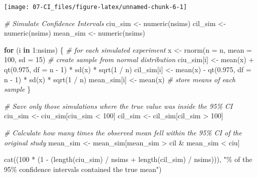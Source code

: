 \documentclass[
]{krantz}
\newenvironment{Shaded}{\begin{snugshade}}{\end{snugshade}}
\newcommand{\AttributeTok}[1]{\textcolor[rgb]{0.77,0.63,0.00}{#1}}
\newcommand{\CommentTok}[1]{\textcolor[rgb]{0.56,0.35,0.01}{\textit{#1}}}
\newcommand{\ControlFlowTok}[1]{\textcolor[rgb]{0.13,0.29,0.53}{\textbf{#1}}}
\newcommand{\DecValTok}[1]{\textcolor[rgb]{0.00,0.00,0.81}{#1}}
\newcommand{\FloatTok}[1]{\textcolor[rgb]{0.00,0.00,0.81}{#1}}
\newcommand{\FunctionTok}[1]{\textcolor[rgb]{0.00,0.00,0.00}{#1}}
\newcommand{\NormalTok}[1]{#1}
\newcommand{\OtherTok}[1]{\textcolor[rgb]{0.56,0.35,0.01}{#1}}
\newcommand{\SpecialCharTok}[1]{\textcolor[rgb]{0.00,0.00,0.00}{#1}}
\newcommand{\StringTok}[1]{\textcolor[rgb]{0.31,0.60,0.02}{#1}}
\begin{document}
\begin{center}\texttt{[image: 07-CI\_files/figure-latex/unnamed-chunk-6-1]} \end{center}

\begin{Shaded}
\begin{Highlighting}[]
\CommentTok{\# Simulate Confidence Intervals}
\NormalTok{ciu\_sim }\OtherTok{\textless{}{-}} \FunctionTok{numeric}\NormalTok{(nsims)}
\NormalTok{cil\_sim }\OtherTok{\textless{}{-}} \FunctionTok{numeric}\NormalTok{(nsims)}
\NormalTok{mean\_sim }\OtherTok{\textless{}{-}} \FunctionTok{numeric}\NormalTok{(nsims)}

\ControlFlowTok{for}\NormalTok{ (i }\ControlFlowTok{in} \DecValTok{1}\SpecialCharTok{:}\NormalTok{nsims) \{ }\CommentTok{\# for each simulated experiment}
\NormalTok{  x }\OtherTok{\textless{}{-}} \FunctionTok{rnorm}\NormalTok{(}\AttributeTok{n =}\NormalTok{ n, }\AttributeTok{mean =} \DecValTok{100}\NormalTok{, }\AttributeTok{sd =} \DecValTok{15}\NormalTok{) }\CommentTok{\# create sample from normal distribution}
\NormalTok{  ciu\_sim[i] }\OtherTok{\textless{}{-}} \FunctionTok{mean}\NormalTok{(x) }\SpecialCharTok{+} \FunctionTok{qt}\NormalTok{(}\FloatTok{0.975}\NormalTok{, }\AttributeTok{df =}\NormalTok{ n }\SpecialCharTok{{-}} \DecValTok{1}\NormalTok{) }\SpecialCharTok{*} \FunctionTok{sd}\NormalTok{(x) }\SpecialCharTok{*} \FunctionTok{sqrt}\NormalTok{(}\DecValTok{1} \SpecialCharTok{/}\NormalTok{ n)}
\NormalTok{  cil\_sim[i] }\OtherTok{\textless{}{-}} \FunctionTok{mean}\NormalTok{(x) }\SpecialCharTok{{-}} \FunctionTok{qt}\NormalTok{(}\FloatTok{0.975}\NormalTok{, }\AttributeTok{df =}\NormalTok{ n }\SpecialCharTok{{-}} \DecValTok{1}\NormalTok{) }\SpecialCharTok{*} \FunctionTok{sd}\NormalTok{(x) }\SpecialCharTok{*} \FunctionTok{sqrt}\NormalTok{(}\DecValTok{1} \SpecialCharTok{/}\NormalTok{ n)}
\NormalTok{  mean\_sim[i] }\OtherTok{\textless{}{-}} \FunctionTok{mean}\NormalTok{(x) }\CommentTok{\# store means of each sample}
\NormalTok{\}}

\CommentTok{\# Save only those simulations where the true value was inside the 95\% CI}
\NormalTok{ciu\_sim }\OtherTok{\textless{}{-}}\NormalTok{ ciu\_sim[ciu\_sim }\SpecialCharTok{\textless{}} \DecValTok{100}\NormalTok{]}
\NormalTok{cil\_sim }\OtherTok{\textless{}{-}}\NormalTok{ cil\_sim[cil\_sim }\SpecialCharTok{\textgreater{}} \DecValTok{100}\NormalTok{]}

\CommentTok{\# Calculate how many times the observed mean fell within the 95\% CI of the original study}
\NormalTok{mean\_sim }\OtherTok{\textless{}{-}}\NormalTok{ mean\_sim[mean\_sim }\SpecialCharTok{\textgreater{}}\NormalTok{ cil }\SpecialCharTok{\&}\NormalTok{ mean\_sim }\SpecialCharTok{\textless{}}\NormalTok{ ciu]}

\FunctionTok{cat}\NormalTok{((}\DecValTok{100} \SpecialCharTok{*}\NormalTok{ (}\DecValTok{1} \SpecialCharTok{{-}}\NormalTok{ (}\FunctionTok{length}\NormalTok{(ciu\_sim) }\SpecialCharTok{/}\NormalTok{ nsims }\SpecialCharTok{+} \FunctionTok{length}\NormalTok{(cil\_sim) }\SpecialCharTok{/}\NormalTok{ nsims))),}
    \StringTok{"\% of the 95\% confidence intervals contained the true mean"}\NormalTok{)}
\end{Highlighting}
\end{Shaded}
\end{document}
